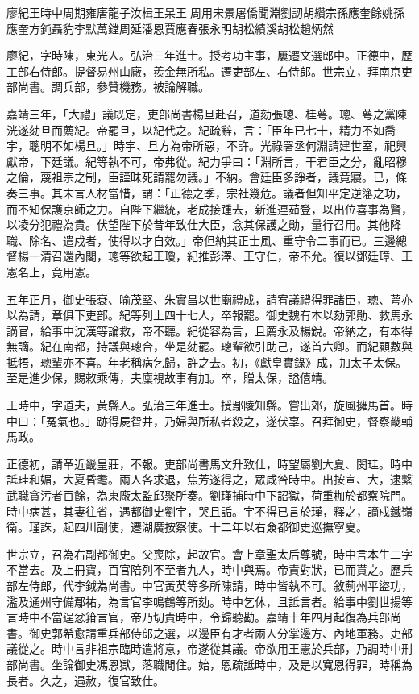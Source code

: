 
\begin{pinyinscope}
廖紀王時中周期雍唐龍子汝楫王杲王周用宋景屠僑聞淵劉訒胡纘宗孫應奎餘姚孫應奎方鈍聶豹李默萬鏜周延潘恩賈應春張永明胡松績溪胡松趙炳然

廖紀，字時陳，東光人。弘治三年進士。授考功主事，屢遷文選郎中。正德中，歷工部右侍郎。提督易州山廠，羨金無所私。遷吏部左、右侍郎。世宗立，拜南京吏部尚書。調兵部，參贊機務。被論解職。

嘉靖三年，「大禮」議既定，吏部尚書楊旦赴召，道劾張璁、桂萼。璁、萼之黨陳洸遂劾旦而薦紀。帝罷旦，以紀代之。紀疏辭，言：「臣年已七十，精力不如喬宇，聰明不如楊旦。」時宇、旦方為帝所惡，不許。光祿署丞何淵請建世室，祀興獻帝，下廷議。紀等執不可，帝弗從。紀力爭曰：「淵所言，干君臣之分，亂昭穆之倫，蔑祖宗之制，臣謹昧死請罷勿議。」不納。會廷臣多諍者，議竟寢。已，條奏三事。其末言人材當惜，謂：「正德之季，宗社幾危。議者但知平定逆籓之功，而不知保護京師之力。自陛下繼統，老成接踵去，新進連茹登，以出位喜事為賢，以凌分犯禮為貴。伏望陛下於昔年致仕大臣，念其保護之勛，量行召用。其他降職、除名、遣戍者，使得以才自效。」帝但納其正士風、重守令二事而已。三邊總督楊一清召還內閣，璁等欲起王瓊，紀推彭澤、王守仁，帝不允。復以鄧廷璋、王憲名上，竟用憲。

五年正月，御史張袞、喻茂堅、朱實昌以世廟禮成，請宥議禮得罪諸臣，璁、萼亦以為請，章俱下吏部。紀等列上四十七人，卒報罷。御史魏有本以劾郭勛、救馬永謫官，給事中沈漢等論救，帝不聽。紀從容為言，且薦永及楊銳。帝納之，有本得無謫。紀在南都，持議與璁合，坐是劾罷。璁輩欲引助己，遂首六卿。而紀顧數與抵牾，璁輩亦不喜。年老稱病乞歸，許之去。初，《獻皇實錄》成，加太子太保。至是進少保，賜敕乘傳，夫廩視故事有加。卒，贈太保，謚僖靖。

王時中，字道夫，黃縣人。弘治三年進士。授鄢陵知縣。嘗出郊，旋風擁馬首。時中曰：「冤氣也。」跡得屍眢井，乃婦與所私者殺之，遂伏辜。召拜御史，督察畿輔馬政。

正德初，請革近畿皇莊，不報。吏部尚書馬文升致仕，時望屬劉大夏、閔珪。時中詆珪和媚，大夏昏耄。兩人各求退，焦芳遂得之，眾咸咎時中。出按宣、大，逮繫武職貪污者百餘，為東廠太監邱聚所奏。劉瑾捕時中下詔獄，荷重枷於都察院門。時中病甚，其妻往省，遇都御史劉宇，哭且詬。宇不得已言於瑾，釋之，謫戍鐵嶺衛。瑾誅，起四川副使，遷湖廣按察使。十二年以右僉都御史巡撫寧夏。

世宗立，召為右副都御史。父喪除，起故官。會上章聖太后尊號，時中言本生二字不當去。及上冊寶，百官陪列不至者九人，時中與焉。帝責對狀，已而貰之。歷兵部左侍郎，代李鉞為尚書。中官黃英等多所陳請，時中皆執不可。敘薊州平盜功，濫及通州守備鄢祐，為言官李鳴鶴等所劾。時中乞休，且詆言者。給事中劉世揚等言時中不當逞忿箝言官，帝乃切責時中，令歸聽勘。嘉靖十年四月起復為兵部尚書。御史郭希愈請重兵部侍郎之選，以邊臣有才者兩人分掌邊方、內地軍務。吏部議從之。時中言非祖宗臨時遣將意，帝遂從其議。帝欲用王憲於兵部，乃調時中刑部尚書。坐論御史馮恩獄，落職閒住。始，恩疏詆時中，及是以寬恩得罪，時稱為長者。久之，遇赦，復官致仕。


\end{pinyinscope}
